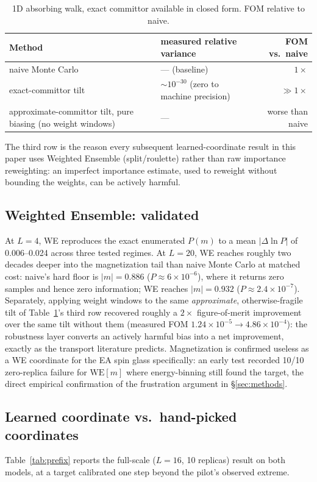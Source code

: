 \documentclass[a4paper,fleqn]{cas-sc}
\begin{document}
\begin{table}[H]
\centering\small
\caption{1D absorbing walk, exact committor available in closed form. FOM relative to naive.}
\label{tab:demo}
\begin{tabular}{p{5.4cm}p{4.4cm}r}
	\toprule
	Method & measured relative variance & FOM vs.\ naive \\
	\midrule
	naive Monte Carlo & --- (baseline) & $1\times$ \\
	exact-committor tilt & $\sim10^{-30}$ (zero to machine precision) & $\gg1\times$ \\
	approximate-committor tilt, pure biasing (no weight windows) & --- & worse than naive \\
	\bottomrule
\end{tabular}
\end{table}

The third row is the reason every subsequent learned-coordinate result in this paper uses
Weighted Ensemble (split/roulette) rather than raw importance reweighting: an imperfect
importance estimate, used to reweight without bounding the weights, can be actively harmful.

\subsection{Weighted Ensemble: validated}\label{sec:res-we}
At $L=4$, WE reproduces the exact enumerated $P(m)$ to a mean $|\Delta\ln P|$ of
0.006--0.024 across three tested regimes. At $L=20$, WE reaches roughly two decades deeper
into the magnetization tail than naive Monte Carlo at matched cost: naive's hard floor is
$|m|=0.886$ ($P\approx6\times10^{-6}$), where it returns zero samples and hence zero
information; WE reaches $|m|=0.932$ ($P\approx2.4\times10^{-7}$). Separately, applying
weight windows to the same \emph{approximate}, otherwise-fragile tilt of
Table~\ref{tab:demo}'s third row recovered roughly a $2\times$ figure-of-merit improvement
over the same tilt without them (measured FOM $1.24\times10^{-5}\to4.86\times10^{-4}$):
the robustness layer converts an actively harmful bias into a net improvement, exactly as
the transport literature predicts. Magnetization is confirmed useless as a WE coordinate
for the EA spin glass specifically: an early test recorded 10/10 zero-replica failure for
$\mathrm{WE}[m]$ where energy-binning still found the target, the direct empirical
confirmation of the frustration argument in \S\ref{sec:methods}.

\subsection{Learned coordinate vs.\ hand-picked coordinates}\label{sec:res-learned}
Table~\ref{tab:prefix} reports the full-scale ($L=16$, 10 replicas) result on both models,
at a target calibrated one step beyond the pilot's observed extreme.
\end{document}
